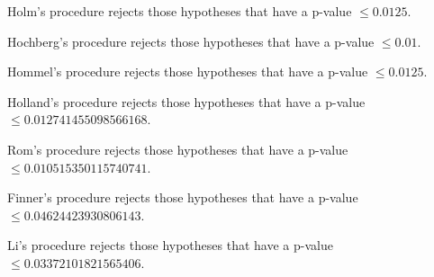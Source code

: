 \documentclass[a4paper,10pt]{article}
\begin{document}
\begin{landscape}
Holm's procedure rejects those hypotheses that have a p-value $\le0.0125$.


Hochberg's procedure rejects those hypotheses that have a p-value $\le0.01$.


Hommel's procedure rejects those hypotheses that have a p-value $\le0.0125$.


Holland's procedure rejects those hypotheses that have a p-value $\le0.012741455098566168$.


Rom's procedure rejects those hypotheses that have a p-value $\le0.010515350115740741$.


Finner's procedure rejects those hypotheses that have a p-value $\le0.04624423930806143$.


Li's procedure rejects those hypotheses that have a p-value $\le0.03372101821565406$.



\newpage


\end{landscape}
\end{document}

